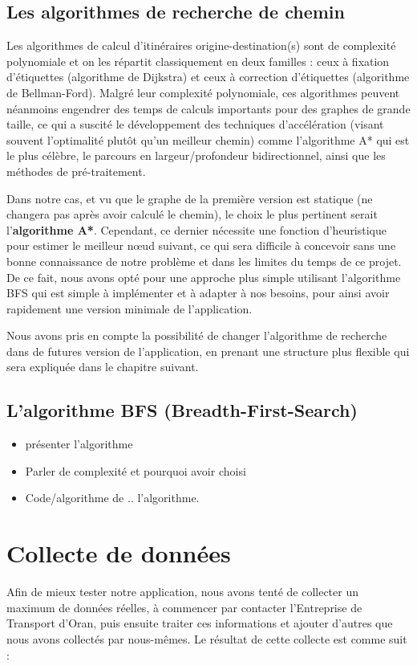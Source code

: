 \subsection{Les algorithmes de recherche de chemin}
Les algorithmes de calcul d'itinéraires origine-destination(s) sont de complexité polynomiale et on les répartit classiquement en deux familles : ceux à fixation d'étiquettes (algorithme de Dijkstra) et ceux à correction d'étiquettes (algorithme de Bellman-Ford).
Malgré leur complexité polynomiale, ces algorithmes peuvent néanmoins engendrer des temps de calculs importants pour des graphes de grande taille, ce qui a suscité le développement des techniques d'accélération (visant souvent l'optimalité plutôt qu'un meilleur chemin) comme l'algorithme A* qui est le plus célèbre, le parcours en largeur/profondeur bidirectionnel, ainsi que les méthodes de pré-traitement.
\newline

Dans notre cas, et vu que le graphe de la première version est statique (ne changera pas après avoir calculé le chemin), le choix le plus pertinent serait l'\textbf{algorithme A*}.
Cependant, ce dernier nécessite une fonction d'heuristique pour estimer le meilleur nœud suivant, ce qui sera difficile à concevoir sans une bonne connaissance de notre problème et dans les limites du temps de ce projet.
De ce fait, nous avons opté pour une approche plus simple utilisant l'algorithme BFS qui est simple à implémenter et à adapter à nos besoins, pour ainsi avoir rapidement une version minimale de l'application.

Nous avons pris en compte la possibilité de changer l'algorithme de recherche dans de futures version de l'application, en prenant une structure plus flexible qui sera expliquée dans le chapitre suivant.

\subsection{L'algorithme BFS (Breadth-First-Search)}
\begin{itemize}
\item présenter l'algorithme
\item Parler de complexité et pourquoi avoir choisi
\item Code/algorithme de .. l'algorithme.
\end{itemize}

\section{Collecte de données}
Afin de mieux tester notre application, nous avons tenté de collecter un maximum de données réelles, à commencer par contacter l'Entreprise de Transport d'Oran, puis ensuite traiter ces informations et ajouter d'autres que nous avons collectés par nous-mêmes.
Le résultat de cette collecte est comme suit :

